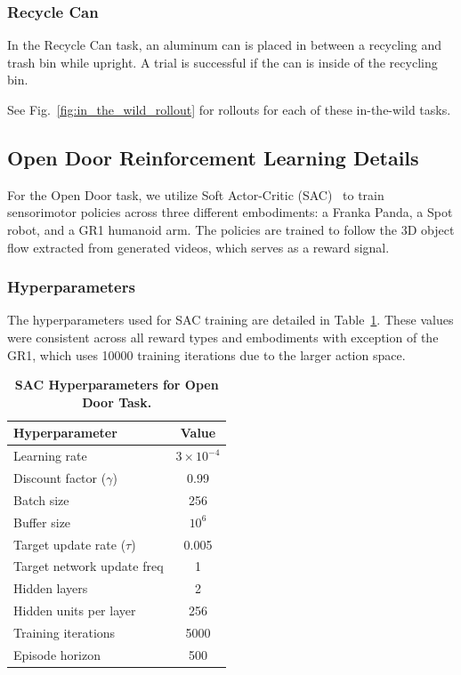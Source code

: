 \subsubsection{Recycle Can}
In the Recycle Can task, an aluminum can is placed in between a recycling and trash bin while upright. A trial is successful if the can is inside of the recycling bin.

See Fig.~\ref{fig:in_the_wild_rollout} for rollouts for each of these in-the-wild tasks.

\subsection{Open Door Reinforcement Learning Details}
\label{sec:open_door_rl}

For the Open Door task, we utilize Soft Actor-Critic (SAC)~\cite{haarnojaSAC2018} to train sensorimotor policies across three different embodiments: a Franka Panda, a Spot robot, and a GR1 humanoid arm. The policies are trained to follow the 3D object flow extracted from generated videos, which serves as a reward signal. 

\subsubsection{Hyperparameters}
The hyperparameters used for SAC training are detailed in Table~\ref{tab:sac_hyperparams}. These values were consistent across all reward types and embodiments with exception of the GR1, which uses 10000 training iterations due to the larger action space.

\begin{table}[h]
    \centering
    \begin{tabular}{lc}
        \toprule
        Hyperparameter & Value \\
        \midrule
        Learning rate & $3 \times 10^{-4}$ \\
        Discount factor ($\gamma$) & 0.99 \\
        Batch size & 256 \\
        Buffer size & $10^6$ \\
        Target update rate ($\tau$) & 0.005 \\
        Target network update freq & 1 \\
        Hidden layers & 2 \\
        Hidden units per layer & 256 \\
        Training iterations & 5000 \\
        Episode horizon & 500 \\
        \bottomrule
    \end{tabular}
    \caption{\textbf{SAC Hyperparameters for Open Door Task.}}
    \label{tab:sac_hyperparams}
\end{table}

